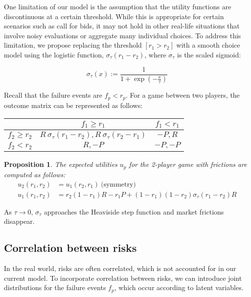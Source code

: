 \documentclass[preprint,12pt,authoryear,doubleblind]{elsarticle}
\newtheorem{proposition}[theorem]{Proposition}
\theoremstyle{definition}
\begin{document}
One limitation of our model is the assumption that the utility functions are discontinuous at a certain threshold. While this is appropriate for certain scenarios such as call for bids, it may not hold in other real-life situations that involve noisy evaluations or aggregate many individual choices. To address this limitation, we propose replacing the threshold $[r_1 > r_2]$ with a smooth choice model using the logistic function, $\sigma_\tau(r_1 - r_2)$, where $\sigma_\tau$ is the scaled sigmoid:

$$\sigma_\tau(x) := \frac{1}{1+\exp\left(-\frac{x}{\tau}\right)}$$


Recall that the failure events are $f_p < r_p$. For a game between two players, the outcome matrix can be represented as follows:
\begin{center}
\begin{tabular}{|c|c|c|}
\cline{2-3}
\multicolumn{1}{c|}{} & $f_1\ge r_1$ & $f_1<r_1$ \\
\hline
$f_2\ge r_2$ & $R~\sigma_\tau(r_1 - r_2), R~\sigma_\tau(r_2 - r_1) $ & $-P, R$ \\
\hline
$f_2<r_2$ & $R, -P$ &  $-P, -P$ \\
\hline
\end{tabular}
\end{center}

\begin{proposition}
\label{prop:frictions}
The expected utilities $u_p$ for the 2-player game with frictions are computed as follows:
\begin{align*}
    u_2(r_1, r_2) &= u_1(r_2, r_1) ~\text{(symmetry)}\\
    u_1(r_1, r_2) &= r_2 (1-r_1) R - r_1 P + (1-r_1)(1-r_2) \sigma_\tau(r_1 - r_2)R
\end{align*}
\end{proposition}

As $\tau \rightarrow 0$, $\sigma_\tau$ approaches the Heaviside step function and market frictions disappear.

\subsection{Correlation between risks}

In the real world, risks are often correlated, which is not accounted for in our current model. To incorporate correlation between risks, we can introduce joint distributions for the failure events $f_p$, which occur according to latent variables.
\end{document}
